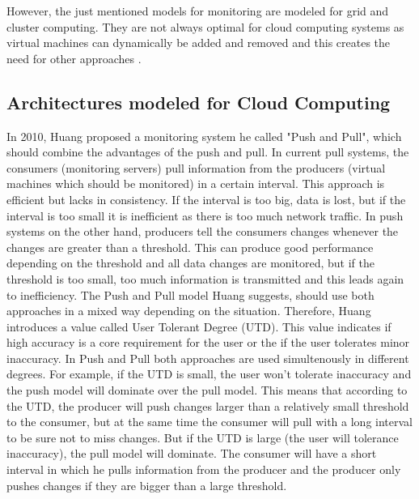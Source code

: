 However, the just mentioned models for monitoring are modeled for grid and cluster computing. They are not always optimal for cloud computing systems as virtual machines can dynamically be added and removed and this creates the need for other approaches \cite{Ward_2014, He_2010}. 

\subsection{Architectures modeled for Cloud Computing}
In 2010, Huang \cite{He_2010} proposed a monitoring system he called "Push and Pull", which should combine the advantages of the push and pull. In current pull systems, the consumers (monitoring servers) pull information from the producers (virtual machines which should be monitored) in a certain interval. This approach is efficient but lacks in consistency. If the interval is too big, data is lost, but if the interval is too small it is inefficient as there is too much network traffic. In push systems on the other hand, producers tell the consumers changes whenever the changes are greater than a threshold. This can produce good performance depending on the threshold and all data changes are monitored, but if the threshold is too small, too much information is transmitted and this leads again to inefficiency. The Push and Pull model Huang suggests, should use both approaches in a mixed way depending on the situation. Therefore, Huang introduces a value called User Tolerant Degree (UTD). This value indicates if high accuracy is a core requirement for the user or the if the user tolerates minor inaccuracy. In Push and Pull both approaches are used simultenously in different degrees. For example, if the UTD is small, the user won't tolerate inaccuracy and the push model will dominate over the pull model. This means that according to the UTD, the producer will push changes larger than a relatively small threshold to the consumer, but at the same time the consumer will pull with a long interval to be sure not to miss changes. But if the UTD is large (the user will tolerance inaccuracy), the pull model will dominate. The consumer will have a short interval in which he pulls information from the producer and the producer only pushes changes if they are bigger than a large threshold.

